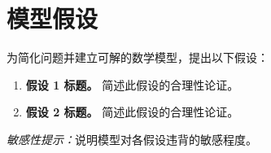 
\section{模型假设}

为简化问题并建立可解的数学模型，提出以下假设：

\begin{enumerate}
    \item \textbf{假设 1 标题。}
    简述此假设的合理性论证。

    \item \textbf{假设 2 标题。}
    简述此假设的合理性论证。
\end{enumerate}

\noindent
\textit{敏感性提示：}说明模型对各假设违背的敏感程度。
